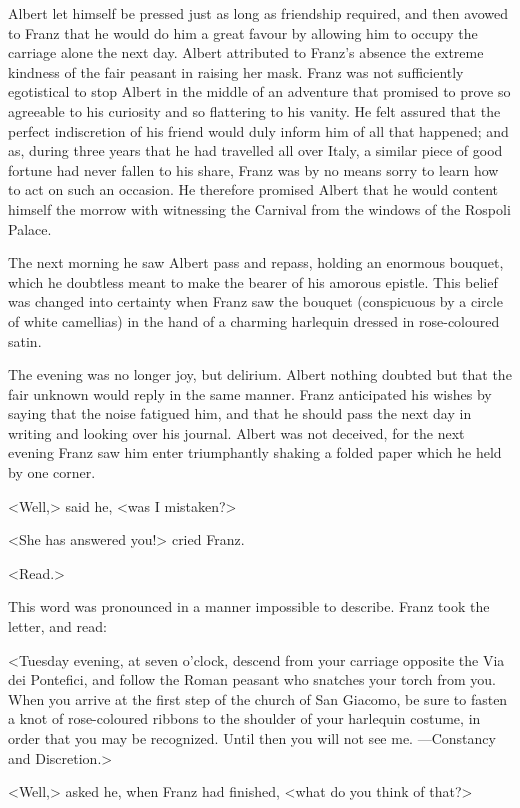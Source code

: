  Albert let himself be pressed just as long as friendship required, and then avowed to Franz that he would do him a great favour by allowing him to occupy the carriage alone the next day. Albert attributed to Franz's absence the extreme kindness of the fair peasant in raising her mask. Franz was not sufficiently egotistical to stop Albert in the middle of an adventure that promised to prove so agreeable to his curiosity and so flattering to his vanity. He felt assured that the perfect indiscretion of his friend would duly inform him of all that happened; and as, during three years that he had travelled all over Italy, a similar piece of good fortune had never fallen to his share, Franz was by no means sorry to learn how to act on such an occasion. He therefore promised Albert that he would content himself the morrow with witnessing the Carnival from the windows of the Rospoli Palace. 

 The next morning he saw Albert pass and repass, holding an enormous bouquet, which he doubtless meant to make the bearer of his amorous epistle. This belief was changed into certainty when Franz saw the bouquet (conspicuous by a circle of white camellias) in the hand of a charming harlequin dressed in rose-coloured satin. 

 The evening was no longer joy, but delirium. Albert nothing doubted but that the fair unknown would reply in the same manner. Franz anticipated his wishes by saying that the noise fatigued him, and that he should pass the next day in writing and looking over his journal. Albert was not deceived, for the next evening Franz saw him enter triumphantly shaking a folded paper which he held by one corner. 

 <Well,> said he, <was I mistaken?> 

 <She has answered you!> cried Franz. 

 <Read.> 

 This word was pronounced in a manner impossible to describe. Franz took the letter, and read: 

 <Tuesday evening, at seven o'clock, descend from your carriage opposite the Via dei Pontefici, and follow the Roman peasant who snatches your torch from you. When you arrive at the first step of the church of San Giacomo, be sure to fasten a knot of rose-coloured ribbons to the shoulder of your harlequin costume, in order that you may be recognized. Until then you will not see me. —Constancy and Discretion.> 

 <Well,> asked he, when Franz had finished, <what do you think of that?> 

